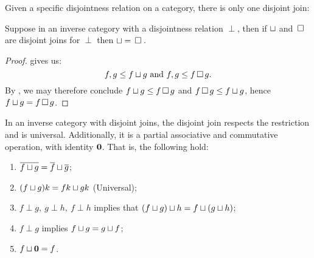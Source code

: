 Given a specific disjointness relation on a category, there is only one disjoint join:
\begin{lemma}\label{lem:disjoint_join_is_unique}
  Suppose \X in an inverse category with a disjointness relation $\perp$, then if  $\sqcup$ and
  $\,\square\,$ are disjoint joins for $\perp$ then $\sqcup = \,\square\,$.
\end{lemma}
\begin{proof}
   gives us:
  \[
    f,g \le f\sqcup g\text{ and }f,g \le f \,\square\, g.
  \]
  By , we may therefore conclude $f \sqcup g \le f \,\square\, g$ and
  $f \,\square\, g \le f\sqcup g$, hence $f \sqcup g = f \,\square\, g$.
\end{proof}
\begin{lemma}\label{lem:join_is_associative_and_commutative_monoid}
  In an inverse category with disjoint joins, the disjoint join respects the restriction and is
  universal. Additionally, it is a partial associative and
  commutative operation, with identity $\mathbf{0}$. That is, the following hold:
  \begin{enumerate}[{(}i{)}]
    \item $\overline{f\sqcup g} = \overline{f} \sqcup \overline{g}$;
    \item $(f \sqcup g)k = f k \sqcup g k$ (Universal);
    \item $f \perp g,\ g\perp h,\ f\perp h$ implies that $(f\sqcup g)\sqcup h = f\sqcup(g\sqcup
      h)$; \label{lemitem:associative_join}
    \item $f \perp g$ implies $f \sqcup g = g \sqcup f$; \label{lemitem:commutative_join}
    \item $f \sqcup \mathbf{0} = f$. \label{lemitem:identity_for_join}
  \end{enumerate}
\end{lemma}
